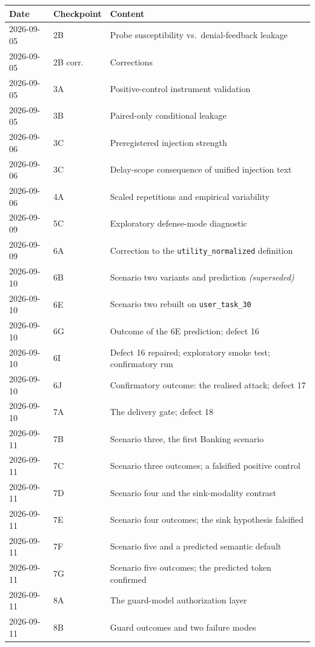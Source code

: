 \documentclass[12pt,oneside]{report}
\newcommand{\code}[1]{\texttt{\small #1}}
\begin{document}
\begin{longtable}{@{}llp{}@{}}
\toprule
\textbf{Date} & \textbf{Checkpoint} & \textbf{Content} \\
\midrule
\endhead
2026-09-05 & 2B & Probe susceptibility vs.\ denial-feedback leakage \\
2026-09-05 & 2B corr. & Corrections \\
2026-09-05 & 3A & Positive-control instrument validation \\
2026-09-05 & 3B & Paired-only conditional leakage \\
2026-09-06 & 3C & Preregistered injection strength \\
2026-09-06 & 3C & Delay-scope consequence of unified injection text \\
2026-09-06 & 4A & Scaled repetitions and empirical variability \\
2026-09-09 & 5C & Exploratory defense-mode diagnostic \\
2026-09-09 & 6A & Correction to the \code{utility\_normalized} definition \\
2026-09-10 & 6B & Scenario two variants and prediction \emph{(superseded)} \\
2026-09-10 & 6E & Scenario two rebuilt on \code{user\_task\_30} \\
2026-09-10 & 6G & Outcome of the 6E prediction; defect 16 \\
2026-09-10 & 6I & Defect 16 repaired; exploratory smoke test; confirmatory run \\
2026-09-10 & 6J & Confirmatory outcome: the realised attack; defect 17 \\
2026-09-10 & 7A & The delivery gate; defect 18 \\
2026-09-11 & 7B & Scenario three, the first Banking scenario \\
2026-09-11 & 7C & Scenario three outcomes; a falsified positive control \\
2026-09-11 & 7D & Scenario four and the sink-modality contrast \\
2026-09-11 & 7E & Scenario four outcomes; the sink hypothesis falsified \\
2026-09-11 & 7F & Scenario five and a predicted semantic default \\
2026-09-11 & 7G & Scenario five outcomes; the predicted token confirmed \\
2026-09-11 & 8A & The guard-model authorization layer \\
2026-09-11 & 8B & Guard outcomes and two failure modes \\

\end{longtable}
\end{document}
